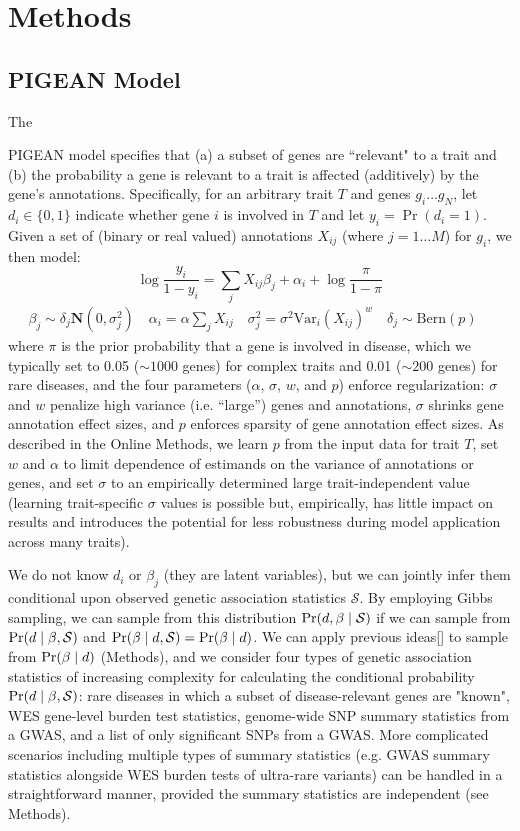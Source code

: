 \section{Methods}\label{sec:methods}

\subsection{PIGEAN Model}
\hypertarget{pigeanpior}{The} PIGEAN model specifies that (a) a subset of genes are ``relevant" to a trait and (b) the probability a gene is relevant to a trait is affected (additively) by the gene’s annotations. Specifically, for an arbitrary trait $T$ and genes $g_i\ldots g_N$, let $d_i \in\{0,1\}$ indicate whether gene $i$ is involved in $T$ and let $y_i=\Pr(d_i=1)$. Given a set of (binary or real valued) annotations $X_{ij}$ (where $j=1\dots M$) for $g_i$, we then model:
\[
\log\frac{y_i}{1-y_i} = \sum_j X_{ij}\beta_j + \alpha_i + \log\frac{\pi}{1-\pi} 
\]
\begin{align*}
\beta_j \sim \delta_j\mathbf{N}(0, \sigma_j^2) \quad
\alpha_i = \alpha\sum_j X_{ij} \quad
\sigma_j^2 = \sigma^2\text{Var}_i(X_{ij})^w \quad
\delta_j \sim \text{Bern}(p) \quad
\end{align*}
where $\pi$ is the prior probability that a gene is involved in disease, which we typically set to 0.05 ($\sim 1000$ genes) for complex traits and 0.01 ($\sim 200$ genes) for rare diseases, and the four parameters ($\alpha$, $\sigma$, $w$, and $p$) enforce regularization: $\sigma$ and $w$ penalize high variance (i.e. “large”) genes and annotations, $\sigma$ shrinks gene annotation effect sizes, and $p$ enforces sparsity of gene annotation effect sizes. As described in the Online Methods, we learn $p$ from the input data for trait $T$, set $w$ and $\alpha$ to limit dependence of estimands on the variance of annotations or genes, and set $\sigma$ to an empirically determined large trait-independent value (learning trait-specific $\sigma$ values is possible but, empirically, has little impact on results and introduces the potential for less robustness during model application across many traits).

We do not know $d_i$ or $\beta_j$ (they are latent variables), but we can jointly infer them conditional upon observed genetic association statistics $\mathcal{S}$. By employing Gibbs sampling, we can sample from this distribution $\text{Pr}(d, \beta \mid \mathcal{S})$ if we can sample from $\text{Pr}(d \mid \beta, \mathcal{S})$ and $\text{Pr}(\beta \mid d, \mathcal{S})=\text{Pr}(\beta \mid d)$. We can apply previous ideas[] to sample from $\text{Pr}(\beta \mid d)$ (Methods), and we consider four types of genetic association statistics of increasing complexity for calculating the conditional probability $\text{Pr}(d \mid \beta, \mathcal{S})$: rare diseases in which a subset of disease-relevant genes are "known", WES gene-level burden test statistics, genome-wide SNP summary statistics from a GWAS, and a list of only significant SNPs from a GWAS. More complicated scenarios including multiple types of summary statistics (e.g. GWAS summary statistics alongside WES burden tests of ultra-rare variants) can be handled in a straightforward manner, provided the summary statistics are independent (see Methods).

